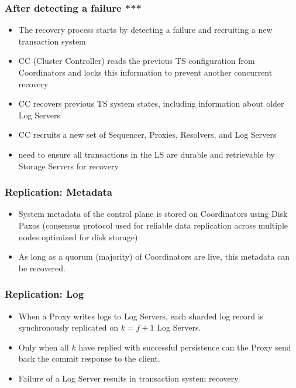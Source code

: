 \begin{frame}
	\frametitle{After detecting a failure ***}
    \begin{itemize}
        \item The recovery process starts by
detecting a failure and recruiting a new transaction system
\item CC (Cluster Controller) reads the previous TS configuration from Coordinators and locks this information
to prevent another concurrent recovery
\item CC recovers previous TS system states, including information about older
Log Servers
\item CC recruits a new set of Sequencer, Proxies, Resolvers,
and Log Servers
\item need to ensure all transactions in the LS are durable and retrievable by
Storage Servers for recovery

    \end{itemize}

\end{frame}





\begin{frame}
	\frametitle{Replication: Metadata}
    \begin{itemize}
      \item System metadata of the control plane is stored on Coordinators using Disk Paxos (consensus protocol used for reliable data replication across multiple nodes optimized for disk storage)
      \item As long as a quorum (majority) of Coordinators are live, this metadata can be recovered.

\end{itemize}
\end{frame}



\begin{frame}
	\frametitle{Replication: Log}
\begin{itemize}

      \item When a Proxy writes logs to Log Servers, each sharded log record is synchronously replicated on \( k = f + 1 \) Log Servers.
      \item Only when all \( k \) have replied with successful persistence can the Proxy send back the commit response to the client.
      \item Failure of a Log Server results in transaction system recovery.

\end{itemize}
\end{frame}

